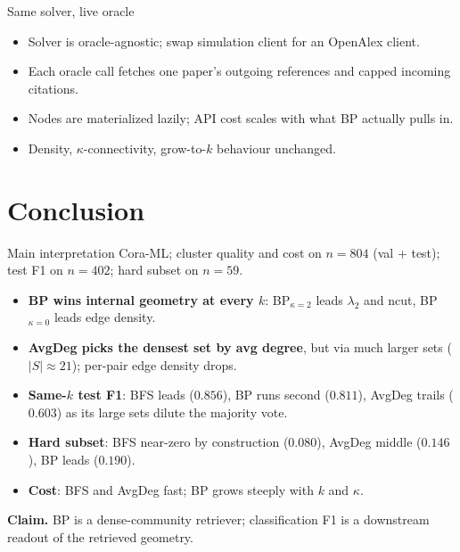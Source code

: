 \documentclass{beamer}
\begin{document}
\begin{frame}{Same solver, live oracle}
  \begin{itemize}
    \item Solver is oracle-agnostic; swap simulation client for an OpenAlex client.
    \item Each oracle call fetches one paper's outgoing references and capped incoming citations.
    \item Nodes are materialized lazily; API cost scales with what BP actually pulls in.
    \item Density, $\kappa$-connectivity, grow-to-$k$ behaviour unchanged.
  \end{itemize}
\end{frame}

\section{Conclusion}

\begin{frame}{Main interpretation}
  Cora-ML; cluster quality and cost on $n = 804$ (val + test); test F1 on $n = 402$; hard subset on $n = 59$.

  \vfill

  \begin{itemize}
    \item \textbf{BP wins internal geometry at every $k$}: BP$_{\kappa=2}$ leads $\lambda_2$ and ncut, BP$_{\kappa=0}$ leads edge density.
    \item \textbf{AvgDeg picks the densest set by avg degree}, but via much larger sets ($|S| \approx 21$); per-pair edge density drops.
    \item \textbf{Same-$k$ test F1}: BFS leads ($0.856$), BP runs second ($0.811$), AvgDeg trails ($0.603$) as its large sets dilute the majority vote.
    \item \textbf{Hard subset}: BFS near-zero by construction ($0.080$), AvgDeg middle ($0.146$), BP leads ($0.190$).
    \item \textbf{Cost}: BFS and AvgDeg fast; BP grows steeply with $k$ and $\kappa$.
  \end{itemize}

  \vfill

  \textbf{Claim.} BP is a dense-community retriever; classification F1 is a downstream readout of the retrieved geometry.
\end{frame}
\end{document}
